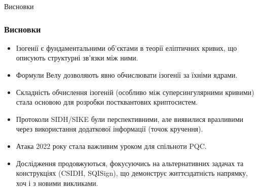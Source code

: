\documentclass[9pt]{beamer}
\begin{document}
\begin{darkframes}
\begin{frame}{Висновки}
  \frametitle{Висновки}
  \begin{itemize}
    \item Ізогенії є фундаментальними об'єктами в теорії еліптичних кривих, що описують структурні зв'язки між ними.
    \item Формули Велу дозволяють явно обчислювати ізогенії за їхніми ядрами.
    \item Складність обчислення ізогеній (особливо між суперсингулярними кривими) стала основою для розробки постквантових криптосистем.
    \item Протоколи SIDH/SIKE були перспективними, але виявилися вразливими через використання додаткової інформації (точок кручення).
    \item Атака 2022 року стала важливим уроком для спільноти PQC.
    \item Дослідження продовжуються, фокусуючись на альтернативних задачах та конструкціях (CSIDH, SQISign), що демонструє життєздатність напрямку, хоч і з новими викликами.
  \end{itemize}
\end{frame}

  \end{darkframes}
\end{document}
